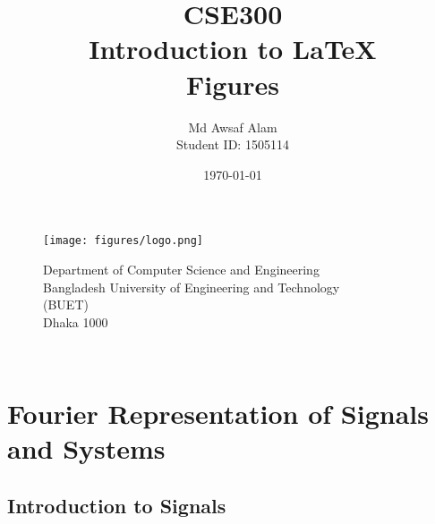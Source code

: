 \documentclass{article}
\title{CSE300\\Introduction to \LaTeX \\Figures}
\author{Md Awsaf Alam\\Student ID: 1505114}
\date{}
\begin{document}
\maketitle
\begin{figure}[h]
    \centering
    \texttt{[image: figures/logo.png]}
    \centering

    Department of Computer Science and Engineering \\
Bangladesh University of Engineering and Technology\\
(BUET)\\
Dhaka 1000\\
\date{\today}\\
\end{figure}


\newpage

\tableofcontents
\newpage

\section{Fourier Representation of Signals and Systems}

\subsection{Introduction to Signals}
\end{document}

